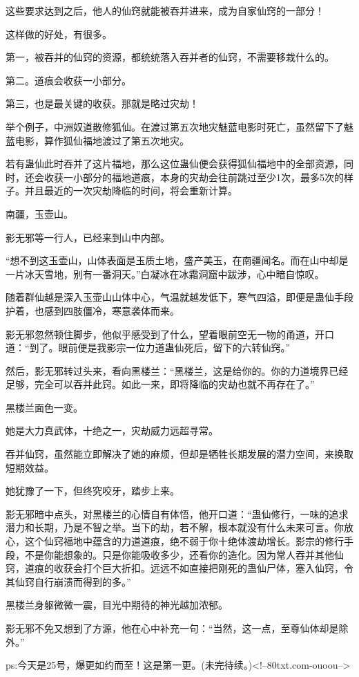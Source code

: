 \begin{this_body}
这些要求达到之后，他人的仙窍就能被吞并进来，成为自家仙窍的一部分！

这样做的好处，有很多。

第一，被吞并的仙窍的资源，都统统落入吞并者的仙窍，不需要移栽什么的。

第二。道痕会收获一小部分。

第三，也是最关键的收获。那就是略过灾劫！

举个例子，中洲奴道散修狐仙。在渡过第五次地灾魅蓝电影时死亡，虽然留下了魅蓝电影，算作狐仙福地渡过了第五次地灾。

若有蛊仙此时吞并了这片福地，那么这位蛊仙便会获得狐仙福地中的全部资源，同时，还会收获一小部分的福地道痕，本身的灾劫会往前跳过至少1次，最多5次的样子。并且最近的一次灾劫降临的时间，将会重新计算。

南疆，玉壶山。

影无邪等一行人，已经来到山中内部。

“想不到这玉壶山，山体表面是玉质土地，盛产美玉，在南疆闻名。而在山中却是一片冰天雪地，别有一番洞天。”白凝冰在冰霜洞窟中跋涉，心中暗自惊叹。

随着群仙越是深入玉壶山山体中心，气温就越发低下，寒气四溢，即便是蛊仙手段护着，也感到四肢僵冷，寒意袭体而来。

影无邪忽然顿住脚步，他似乎感受到了什么，望着眼前空无一物的甬道，开口道：“到了。眼前便是我影宗一位力道蛊仙死后，留下的六转仙窍。”

然后，影无邪转过头来，看向黑楼兰：“黑楼兰，这是给你的。你的力道境界已经足够，完全可以吞并此窍。如此一来，即将降临的灾劫也就不再存在了。”

黑楼兰面色一变。

她是大力真武体，十绝之一，灾劫威力远超寻常。

吞并仙窍，虽然能立即解决了她的麻烦，但却是牺牲长期发展的潜力空间，来换取短期效益。

她犹豫了一下，但终究咬牙，踏步上来。

影无邪暗中点头，对黑楼兰的心情自有体悟，他开口道：“蛊仙修行，一味的追求潜力和长期，乃是不智之举。当下的劫，若不解，根本就没有什么未来可言。你放心，这个仙窍福地中蕴含的力道道痕，绝不弱于你十绝体渡劫增长。影宗的修行手段，不是你能想象的。只是你能吸收多少，还看你的造化。因为常人吞并其他仙窍，道痕的收获会打个巨大折扣。远远不如直接把刚死的蛊仙尸体，塞入仙窍，令其仙窍自行崩溃而得到的多。”

黑楼兰身躯微微一震，目光中期待的神光越加浓郁。

影无邪不免又想到了方源，他在心中补充一句：“当然，这一点，至尊仙体却是除外。”

ps:今天是25号，爆更如约而至！这是第一更。(未完待续。)<!--80txt.com-ouoou-->

\end{this_body}

